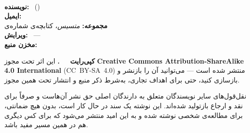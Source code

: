 \thispagestyle{empty}
\vspace*{0.8cm}
\begin{flushleft}
{\small\linespread{1.3}\selectfont

\textbf{\BookletTitle}\\[0.2em]
{\color{textsecondary}\BookletSubtitle}

\vspace{0.9em}

\textbf{نویسنده:} \BookletAuthor\ (\BookletAuthorHandle)\\
\textbf{ایمیل:} \\
\textbf{مجموعه:} \textit{متسیس}، کتابچه‌ی شماره‌ی \BookletNumber\\
\textbf{ویرایش:} \BookletEdition\ --- \BookletYear\\
\textbf{مخزن منبع:} 

\vspace{0.9em}

\textbf{کپی‌رایت \textcopyright\ \BookletYear\ \BookletAuthor.}
این اثر تحت مجوز \textbf{Creative Commons Attribution-ShareAlike 4.0
International} (CC~BY-SA~4.0) منتشر شده است --- می‌توانید آن را
بازنشر و بازسازی کنید، حتی برای اهداف تجاری، به‌شرط ذکر منبع و انتشار
تحت همین مجوز.

\vspace{0.7em}

نقل‌قول‌های سایر نویسندگان متعلق به دارندگان اصلی حق نشر آن‌هاست و
صرفاً برای نقد و ارجاع بازتولید شده‌اند. این نوشته یک سند در حال کار
است، بدون هیچ ضمانتی، برای مطالعه‌ی شخصی نوشته شده و به این امید
منتشر می‌شود که برای کس دیگری هم در همین مسیر مفید باشد.

}
\end{flushleft}
\clearpage
